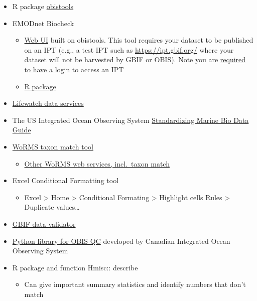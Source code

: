 \documentclass[
  letterpaper,
  DIV=11,
  numbers=noendperiod,
  oneside]{scrreprt}
\providecommand{\tightlist}{%
  \setlength{\itemsep}{0pt}\setlength{\parskip}{0pt}}\usepackage{longtable,booktabs,array}
\begin{document}
\begin{itemize}
\tightlist
\item
  R package \href{https://github.com/iobis/obistools}{obistools}
\item
  EMODnet Biocheck

  \begin{itemize}
  \tightlist
  \item
    \href{https://rshiny.lifewatch.be/BioCheck/}{Web UI} built on
    obistools. This tool requires your dataset to be published on an IPT
    (e.g., a test IPT such as \url{https://ipt.gbif.org/} where your
    dataset will not be harvested by GBIF or OBIS). Note you are
    \href{ipt.html}{required to have a login} to access an IPT
  \item
    \href{https://github.com/EMODnet/EMODnetBiocheck}{R package}
  \end{itemize}
\item
  \href{https://www.lifewatch.be/data-services/}{Lifewatch data
  services}
\item
  The US Integrated Ocean Observing System
  \href{https://github.com/ioos/bio_data_guide/blob/main/datasets/TPWD_HARC_BagSeine/TPWD_HARC_BagSeine_OBISENV.md}{Standardizing
  Marine Bio Data Guide}
\item
  \href{https://www.marinespecies.org/aphia.php?p=match}{WoRMS taxon
  match tool}

  \begin{itemize}
  \tightlist
  \item
    \href{https://www.marinespecies.org/aphia.php?p=webservice}{Other
    WoRMS web services, incl.~taxon match}
  \end{itemize}
\item
  Excel Conditional Formatting tool

  \begin{itemize}
  \tightlist
  \item
    Excel \textgreater{} Home \textgreater{} Conditional Formating
    \textgreater{} Highlight cells Rules \textgreater{} Duplicate
    values\ldots{}
  \end{itemize}
\item
  \href{https://www.gbif.org/tools/data-validator}{GBIF data validator}
\item
  \href{https://github.com/cioos-siooc/pyobistools}{Python library for
  OBIS QC} developed by Canadian Integrated Ocean Observing System
\item
  R package and function Hmisc:: describe

  \begin{itemize}
  \tightlist
  \item
    Can give important summary statistics and identify numbers that
    don't match
  \end{itemize}
\end{itemize}
\end{document}
